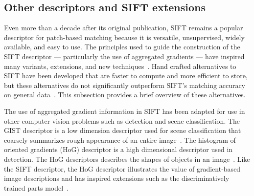     \subsection{Other descriptors and SIFT extensions}
        Even more than a decade after its original publication, SIFT remains a popular descriptor for patch-based
          matching because it is versatile, unsupervised, widely available, and easy to use.
        The principles used to guide the construction of the SIFT descriptor --- particularly the use of
          aggregated gradients --- have inspired many variants, extensions, and new
          techniques~\cite{mikolajczyk_performance_2005, dalal_histograms_2005, bay_surf_2006}.
        Hand crafted alternatives to SIFT have been developed that are faster to compute and more efficient to
          store, but these alternatives do not significantly outperform SIFT's matching accuracy on general
          data~\cite{lowe_distinctive_2004, mikolajczyk_performance_2005, alahi_freak_2012}.
        This subsection provides a brief overview of these alternatives.

        The use of aggregated gradient information in SIFT has been adapted for use in other computer vision
        problems such as detection and scene classification.
        The GIST descriptor is a low dimension descriptor used for scene classification that coarsely summarizes
        rough appearance of an entire image~\cite{oliva_modeling_2001, douze_evaluation_2009}.
        The histogram of oriented gradients (HoG) descriptor is a high dimensional descriptor used in detection.
        The HoG descriptors describes the shapes of objects in an image~\cite{dalal_histograms_2005}. Like the SIFT
        descriptor, the HoG descriptor illustrates the value of gradient-based image descriptions and has inspired
        extensions such as the discriminatively trained parts model~\cite{felzenszwalb_object_2010}.

